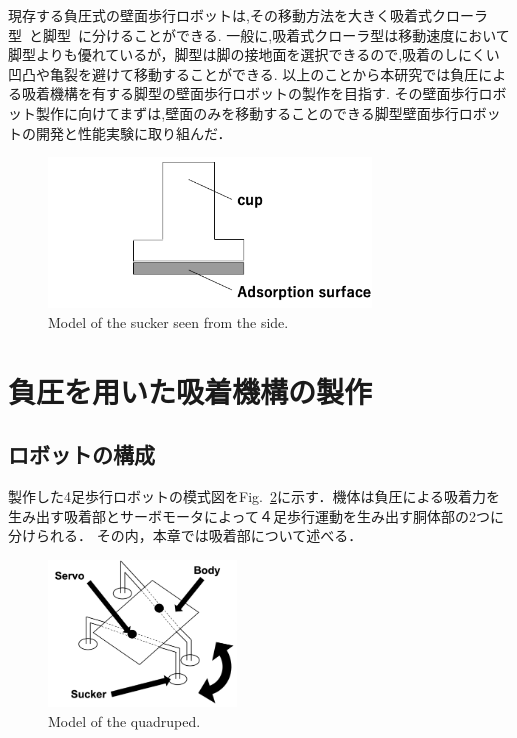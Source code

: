\documentclass[uplatex,dvipdfmx]{jlreq}
\begin{document}
現存する負圧式の壁面歩行ロボットは,その移動方法を大きく吸着式クローラ型~\cite{福田敏男1994壁面走行ロボットの研究}と脚型~\cite{広瀬茂男1991四足壁面移動ロボット}に分けることができる.
一般に,吸着式クローラ型は移動速度において脚型よりも優れているが\cite{福田敏男1992壁面走行ロボッ}，脚型は脚の接地面を選択できるので,吸着のしにくい凹凸や亀裂を避けて移動することができる.
以上のことから本研究では負圧による吸着機構を有する脚型の壁面歩行ロボットの製作を目指す.
その壁面歩行ロボット製作に向けてまずは,壁面のみを移動することのできる脚型壁面歩行ロボットの開発と性能実験に取り組んだ．


\begin{figure}[t]
    \centering
    \includegraphics[height=40mm,]{./figure/sideview_sucker.png}
    \caption{Model of the sucker seen from the side.}
    \label{fig:model_sucker}
\end{figure}

\section{負圧を用いた吸着機構の製作}
\subsection{ロボットの構成}
製作した4足歩行ロボットの模式図をFig.~\ref{fig:model_of_the_quadruped}に示す．機体は負圧による吸着力を生み出す吸着部とサーボモータによって４足歩行運動を生み出す胴体部の2つに分けられる．
その内，本章では吸着部について述べる．

\begin{figure}[b!]
    \centering
    \includegraphics[width=50mm]{./figure/overview_model.png}
    \caption{Model of the quadruped.}
    \label{fig:model_of_the_quadruped}
\end{figure}
\end{document}
